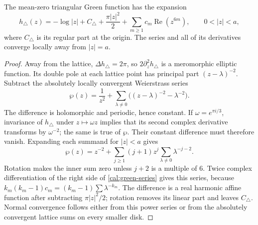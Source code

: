 \begin{lemma}\label{cal:green-expansion}
The mean-zero triangular Green function has the expansion
\begin{equation}\label{cal:green-series}
 h_\triangle(z)=-\log|z|+C_\triangle+\frac{\pi|z|^2}{2}
                 +\sum_{m\ge1}c_m\operatorname{Re}(z^{6m}),
 \qquad 0<|z|<a,
\end{equation}
where $C_\triangle$ is its regular part at the origin.  The series and
all of its derivatives converge locally away from $|z|=a$.
\end{lemma}
\begin{proof}
Away from the lattice, $\Delta h_\triangle=2\pi$, so
$2\partial_z^2h_\triangle$ is a meromorphic elliptic function.  Its double
pole at each lattice point has principal part $(z-\lambda)^{-2}$.
Subtract the absolutely locally convergent Weierstrass series
\[
 \wp(z)=\frac1{z^2}+\sum_{\lambda\ne0}
       \bigl((z-\lambda)^{-2}-\lambda^{-2}\bigr).
\]
The difference is holomorphic and periodic, hence constant.  If
$\omega=e^{\pi i/3}$, invariance of $h_\triangle$ under $z\mapsto\omega z$
implies that its second complex derivative transforms by $\omega^{-2}$;
the same is true of $\wp$.  Their constant difference must therefore vanish.
Expanding each summand for $|z|<a$ gives
\[
 \wp(z)=z^{-2}+\sum_{j\ge1}(j+1)z^j
                         \sum_{\lambda\ne0}\lambda^{-j-2}.
\]
Rotation makes the inner sum zero unless $j+2$ is a multiple of $6$.
Twice complex differentiation of the right side of
\eqref{cal:green-series} gives this series, because
$k_m(k_m-1)c_m=(k_m-1)\sum\lambda^{-k_m}$.
The difference is a real harmonic affine function after subtracting
$\pi|z|^2/2$; rotation removes its linear part and leaves $C_\triangle$.
Normal convergence follows either from this power series or from the
absolutely convergent lattice sums on every smaller disk.
\end{proof}

